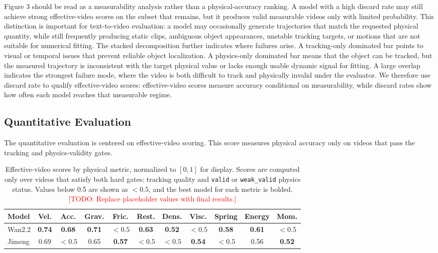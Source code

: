 \documentclass{article}
\newcommand{\todo}[1]{\textcolor{red}{[TODO: #1]}}
\begin{document}
Figure 3 should be read as a measurability analysis rather than a physical-accuracy ranking.
A model with a high discard rate may still achieve strong effective-video scores on the subset that remains, but it produces valid measurable videos only with limited probability.
This distinction is important for text-to-video evaluation: a model may occasionally generate trajectories that match the requested physical quantity, while still frequently producing static clips, ambiguous object appearances, unstable tracking targets, or motions that are not suitable for numerical fitting.
The stacked decomposition further indicates where failures arise.
A tracking-only dominated bar points to visual or temporal issues that prevent reliable object localization.
A physics-only dominated bar means that the object can be tracked, but the measured trajectory is inconsistent with the target physical value or lacks enough usable dynamic signal for fitting.
A large overlap indicates the strongest failure mode, where the video is both difficult to track and physically invalid under the evaluator.
We therefore use discard rate to qualify effective-video scores: effective-video scores measure accuracy conditional on measurability, while discard rates show how often each model reaches that measurable regime.

\subsection{Quantitative Evaluation}

The quantitative evaluation is centered on effective-video scoring.
This score measures physical accuracy only on videos that pass the tracking and physics-validity gates.

\begin{table}[H]
\centering
\scriptsize
\setlength{\tabcolsep}{3pt}
\caption{Effective-video scores by physical metric, normalized to $[0,1]$ for display. Scores are computed only over videos that satisfy both hard gates: tracking quality and \texttt{valid} or \texttt{weak\_valid} physics status. Values below 0.5 are shown as $<0.5$, and the best model for each metric is bolded. \todo{Replace placeholder values with final results.}}
\label{tab:effective-metric-scores}
\begin{tabular}{lcccccccccc}
\toprule
Model & Vel. & Acc. & Grav. & Fric. & Rest. & Dens. & Visc. & Spring & Energy & Mom. \\
\midrule
Wan2.2 & \textbf{0.74} & \textbf{0.68} & \textbf{0.71} & $<0.5$ & \textbf{0.63} & \textbf{0.52} & $<0.5$ & \textbf{0.58} & \textbf{0.61} & $<0.5$ \\
Jimeng & 0.69 & $<0.5$ & 0.65 & \textbf{0.57} & $<0.5$ & $<0.5$ & \textbf{0.54} & $<0.5$ & 0.56 & \textbf{0.52} \\
\bottomrule
\end{tabular}
\end{table}
\end{document}
